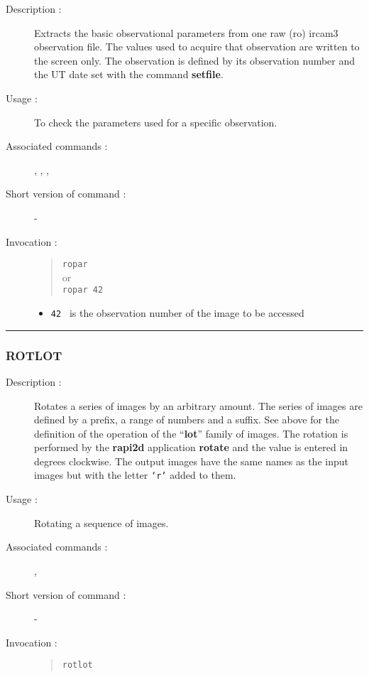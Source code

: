 \begin{description}

\item[Description :] Extracts the basic observational parameters from
one raw ({\sc ro}) {\sc ircam3} observation file.  The values used to
acquire that observation are written to the screen only.  The
observation is defined by its observation number and the UT date set
with the command {\bf setfile}.

\item[Usage :] To check the parameters used for a specific observation.

\item[Associated commands :] {\tt {}}, 
{\tt {}}, {\tt {}}, 
{\tt {}}

\item[Short version of command :] -
\item[Invocation :]

\begin{quote}{\tt  ropar }\\
or \\
{\tt ropar 42 }
\end{quote}

\begin{itemize}

\item {\tt 42 } is the observation number of the image to be accessed
\end{itemize}

\end{description}

\hrule 
\subsubsection*{\label{ROTLOT}ROTLOT}

\begin{description}

\item[Description :] Rotates a series of images by an arbitrary
amount.  The series of images are defined by a prefix, a range of
numbers and a suffix. See above for the definition of the operation of
the ``{\bf lot}'' family of images.  The rotation is performed by the
{\bf rapi2d} application {\bf rotate} and the value is entered in
degrees clockwise.  The output images have the same names as the input
images but with the letter {\tt `r'} added to them.

\item[Usage :] Rotating a sequence of images.

\item[Associated commands :] {\tt {}}, 
{\tt {}}

\item[Short version of command :] -
\item[Invocation :]

\begin{quote}{\tt  rotlot }\end{quote}

\end{description}

